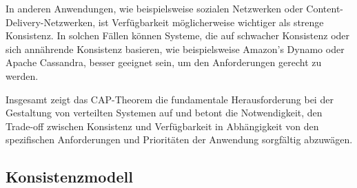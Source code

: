 \documentclass[../vs-script-first-v01.tex]{subfiles}
\begin{document}
In anderen Anwendungen, wie beispielsweise sozialen Netzwerken oder Content-Delivery-Netzwerken, ist Verfügbarkeit möglicherweise wichtiger als strenge Konsistenz. In solchen Fällen können Systeme, die auf schwacher Konsistenz oder  sich annährende Konsistenz basieren, wie beispielsweise Amazon's Dynamo oder Apache Cassandra, besser geeignet sein, um den Anforderungen gerecht zu werden.

Insgesamt zeigt das CAP-Theorem die fundamentale Herausforderung bei der Gestaltung von verteilten Systemen auf und betont die Notwendigkeit, den Trade-off zwischen Konsistenz und Verfügbarkeit in Abhängigkeit von den spezifischen Anforderungen und Prioritäten der Anwendung sorgfältig abzuwägen.

\subsection{Konsistenzmodell}
\end{document}
